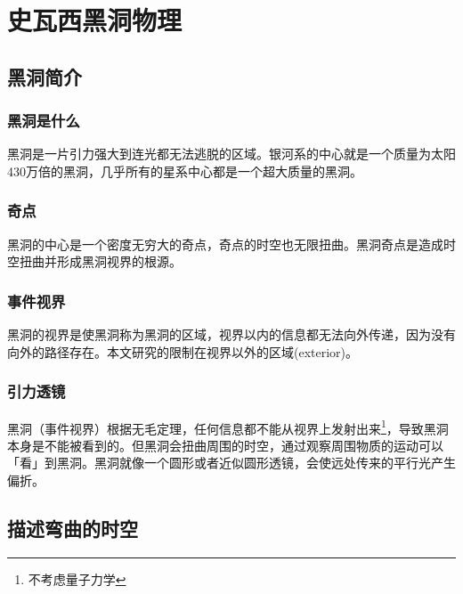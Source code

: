%
%
%
%
%
%

\chapter{史瓦西黑洞物理}
\section{黑洞简介}
\subsection{黑洞是什么}
黑洞是一片引力强大到连光都无法逃脱的区域\cite{what_is_black_hole}。银河系的中心就是一个质量为太阳430万倍的黑洞\cite{galactic_center_bh}，几乎所有的星系中心都是一个超大质量的黑洞。
\subsection{奇点}
黑洞的中心是一个密度无穷大的奇点，奇点的时空也无限扭曲。黑洞奇点是造成时空扭曲并形成黑洞视界的根源。
\subsection{事件视界}
黑洞的视界是使黑洞称为黑洞的区域，视界以内的信息都无法向外传递，因为没有向外的路径存在。本文研究的限制在视界以外的区域(exterior)。
\subsection{引力透镜}
黑洞（事件视界）根据无毛定理，任何信息都不能从视界上发射出来\footnote{不考虑量子力学}，导致黑洞本身是不能被看到的。但黑洞会扭曲周围的时空，通过观察周围物质的运动可以「看」到黑洞。黑洞就像一个圆形或者近似圆形透镜，会使远处传来的平行光产生偏折。

\section{描述弯曲的时空}
